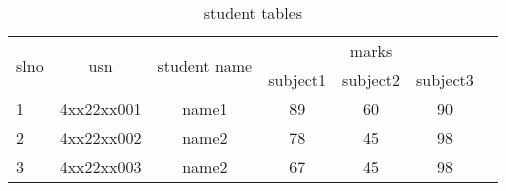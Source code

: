 \documentclass{book}
\begin{document}
\begin{table}
  \centering
  \caption{student tables}
  \label{student}
    \begin{tabular}{|l|c|c|c|c|c|r|}\hline
\multirow{2}{*}{slno}&\multirow{2}{*}{usn}&\multirow{2}{*}{student name}
&\multicolumn {3}{|c|}{marks}\\\vline &&&subject1 &subject2 &subject3 \\\hline
 1&4xx22xx001&name1&89&60&90 \\\hline
 2&4xx22xx002&name2&78&45&98 \\\hline
 3&4xx22xx003&name2&67&45&98 \\\hline
\end{tabular}
\end{table}
\end{document}
